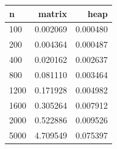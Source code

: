 \begin{tabular}{lrr}
\hline
n & matrix & heap \\
\hline
100 & 0.002069 & 0.000480 \\
200 & 0.004364 & 0.000487 \\
400 & 0.020162 & 0.002637 \\
800 & 0.081110 & 0.003464 \\
1200 & 0.171928 & 0.004982 \\
1600 & 0.305264 & 0.007912 \\
2000 & 0.522886 & 0.009526 \\
5000 & 4.709549 & 0.075397 \\
\hline
\end{tabular}
